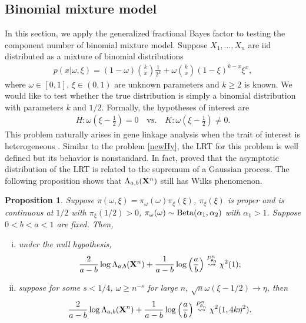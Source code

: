 \documentclass[11pt]{article}
\theoremstyle{plain}
\newtheorem{proposition}{\quad\quad Proposition}
\theoremstyle{definition}
\theoremstyle{remark}
\begin{document}
\subsection{Binomial mixture model}\label{sec:binomial_mixture}
In this section, we apply the generalized fractional Bayes factor to testing the component number of binomial mixture model.
Suppose $X_1, \dots, X_n$ are iid distributed as a mixture of binomial distributions
\begin{align*}
    p(x | \omega, \xi ) 
    =
    (1- \omega) {k \choose x} \frac{1}{2^k}
    + \omega {k \choose x} (1- \xi)^{k-x} \xi^{x},
\end{align*}
where $\omega \in [0,1]$, $ \xi \in (0,1)$ are unknown parameters and $k \geq 2$ is known.
We would like to test whether the true distribution is simply a binomial distribution with parameters $k$ and $1/2$.
Formally, the hypotheses of interest are
\begin{align}\label{Hy:binomial}
    H: \omega(\xi - \frac 1 2) = 0
    \quad
    \text{vs.}
    \quad
    K: \omega(\xi  - \frac 1 2) \neq 0.
\end{align}
This problem naturally arises in gene linkage analysis when the trait of interest is heterogeneous \cite{Risch1989,CHIANO1995}.
Similar to the problem \eqref{newHy}, the LRT for this problem is well defined but its behavior is nonstandard.
In fact, \cite{Chernoff1995} proved that the asymptotic distribution of the LRT is related to the supremum of a Gaussian process.
The following proposition shows that $\Lambda_{a,b}(\mathbf{X}^n)$ still has Wilks phenomenon.
\begin{proposition}
    Suppose $\pi(\omega,\xi)=\pi_{\omega}(\omega) \pi_{\xi}(\xi)$, $\pi_\xi(\xi)$ is proper and is continuous at $1/2$ with $\pi_\xi (1/2) > 0$,
    $\pi_\omega(\omega)\sim \rm{Beta}(\alpha_1,\alpha_2)$ with $\alpha_1>1$.
    Suppose $ 0 < b < a < 1 $ are fixed.
    Then,
    \begin{enumerate}[(i)]
        \item
    under the null hypothesis,
    \begin{equation*}
        \frac{2}{a-b}\log \Lambda_{a,b} (\mathbf{X}^n) + \frac{1}{a-b} \log \left(\frac a b \right) \overset{P^n_{\theta_0}}{\rightsquigarrow}\chi^2(1);
    \end{equation*}
\item
    suppose for some $s<1/4$, $\omega \geq n^{-s}$ for large $n$, $\sqrt{n}\omega (\xi - 1/2) \to \eta$, then
    \begin{equation*}
        \frac{2}{a-b} \log \Lambda_{a,b} (\mathbf{X}^n) + \frac{1}{a-b} \log \left(\frac a b \right) \overset{P^n_{\theta_n}}{\rightsquigarrow}  \chi^2(1, 4 k \eta^2).
    \end{equation*}
\end{enumerate}
    \label{mixtureThm_binom}
\end{proposition}
\end{document}
